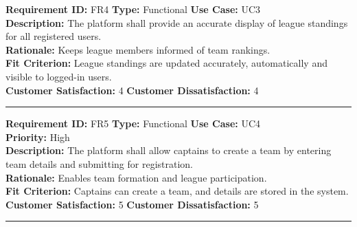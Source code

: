 \documentclass[12pt, titlepage]{article}
\begin{document}
\textbf{Requirement ID:} FR4 \quad \textbf{Type:} Functional \quad \textbf{Use Case:} UC3 \\
\textbf{Description:} The platform shall provide an accurate display of league standings for all registered users.\\
\textbf{Rationale:} Keeps league members informed of team rankings.\\
\textbf{Fit Criterion:} League standings are updated accurately, automatically and visible to logged-in users.\\
\textbf{Customer Satisfaction:} 4 \quad\quad \textbf{Customer Dissatisfaction:} 4\\
\noindent\rule{\textwidth}{1pt}

\textbf{Requirement ID:} FR5 \quad \textbf{Type:} Functional \quad \textbf{Use Case:} UC4 \\
\textbf{Priority:} High \\
\textbf{Description:} The platform shall allow captains to create a team by entering team details and submitting for registration.\\
\textbf{Rationale:} Enables team formation and league participation.\\
\textbf{Fit Criterion:} Captains can create a team, and details are stored in the system.\\
\textbf{Customer Satisfaction:} 5 \quad\quad \textbf{Customer Dissatisfaction:} 5\\
\noindent\rule{\textwidth}{1pt}
\end{document}
